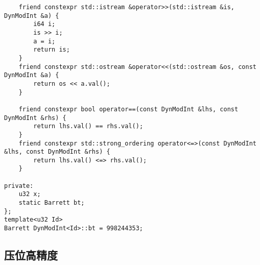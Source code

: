 \documentclass[UTF8]{ctexart}
\begin{document}
\begin{lstlisting}
    friend constexpr std::istream &operator>>(std::istream &is, DynModInt &a) {
        i64 i;
        is >> i;
        a = i;
        return is;
    }
    friend constexpr std::ostream &operator<<(std::ostream &os, const DynModInt &a) {
        return os << a.val();
    }

    friend constexpr bool operator==(const DynModInt &lhs, const DynModInt &rhs) {
        return lhs.val() == rhs.val();
    }
    friend constexpr std::strong_ordering operator<=>(const DynModInt &lhs, const DynModInt &rhs) {
        return lhs.val() <=> rhs.val();
    }

private:
    u32 x;
    static Barrett bt;
};
template<u32 Id>
Barrett DynModInt<Id>::bt = 998244353;
\end{lstlisting}
\subsection{压位高精度}
\end{document}
